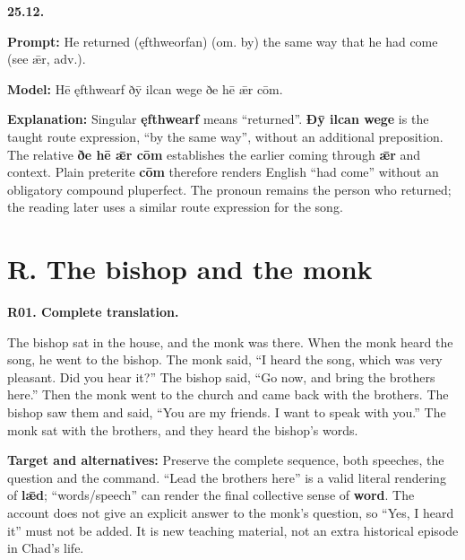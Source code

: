 \par\begin{minipage}{\linewidth}\raggedright
\textbf{25.12.}

\textbf{Prompt:} He returned (ęfthweorfan) (om. by) the same way that he had come (see ǣr, adv.).

\textbf{Model:} Hē ęfthwearf ðȳ ilcan wege ðe hē ǣr cōm.

\textbf{Explanation:} Singular \textbf{ęfthwearf} means “returned”. \textbf{Ðȳ ilcan wege} is the taught route expression, “by the same way”, without an additional preposition. The relative \textbf{ðe hē ǣr cōm} establishes the earlier coming through \textbf{ǣr} and context. Plain preterite \textbf{cōm} therefore renders English “had come” without an obligatory compound pluperfect. The pronoun remains the person who returned; the reading later uses a similar route expression for the song.

\end{minipage}\par\addvspace{4pt}

\clearpage
\section*{R. The bishop and the monk}

\par\begin{minipage}{\linewidth}\raggedright
\textbf{R01. Complete translation.}

The bishop sat in the house, and the monk was there. When the monk heard the song, he went to the bishop. The monk said, “I heard the song, which was very pleasant. Did you hear it?” The bishop said, “Go now, and bring the brothers here.” Then the monk went to the church and came back with the brothers. The bishop saw them and said, “You are my friends. I want to speak with you.” The monk sat with the brothers, and they heard the bishop’s words.

\textbf{Target and alternatives:} Preserve the complete sequence, both speeches, the question and the command. “Lead the brothers here” is a valid literal rendering of \textbf{lǣd}; “words/\allowbreak{}speech” can render the final collective sense of \textbf{word}. The account does not give an explicit answer to the monk’s question, so “Yes, I heard it” must not be added. It is new teaching material, not an extra historical episode in Chad’s life.

\end{minipage}\par\addvspace{4pt}

